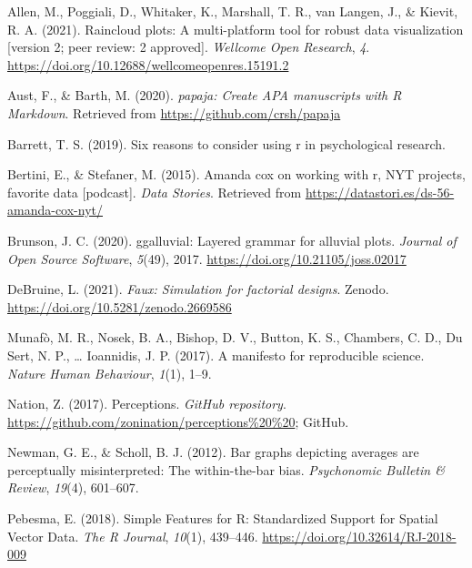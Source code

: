 \documentclass[
  english,
  doc,floatsintext]{apa6}
\newlength{\cslhangindent}
\newenvironment{CSLReferences}[2] %
 {%
  \setlength{\parindent}{0pt}
  \ifodd #1 \everypar{\setlength{\hangindent}{\cslhangindent}}\ignorespaces\fi
  \ifnum #2 > 0
  \setlength{\parskip}{#2\baselineskip}
  \fi
 }%
 {}
\begin{document}
\hypertarget{refs}{}
\begin{CSLReferences}{1}{0}
\leavevmode{}%
Allen, M., Poggiali, D., Whitaker, K., Marshall, T. R., van Langen, J., \& Kievit, R. A. (2021). Raincloud plots: A multi-platform tool for robust data visualization {[}version 2; peer review: 2 approved{]}. \emph{Wellcome Open Research}, \emph{4}. \url{https://doi.org/10.12688/wellcomeopenres.15191.2}

\leavevmode{}%
Aust, F., \& Barth, M. (2020). \emph{{papaja}: {Create} {APA} manuscripts with {R Markdown}}. Retrieved from \url{https://github.com/crsh/papaja}

\leavevmode{}%
Barrett, T. S. (2019). Six reasons to consider using r in psychological research.

\leavevmode{}%
Bertini, E., \& Stefaner, M. (2015). Amanda cox on working with r, NYT projects, favorite data {[}podcast{]}. \emph{Data Stories}. Retrieved from \url{https://datastori.es/ds-56-amanda-cox-nyt/}

\leavevmode{}%
Brunson, J. C. (2020). {ggalluvial}: Layered grammar for alluvial plots. \emph{Journal of Open Source Software}, \emph{5}(49), 2017. \url{https://doi.org/10.21105/joss.02017}

\leavevmode{}%
DeBruine, L. (2021). \emph{Faux: Simulation for factorial designs}. Zenodo. \url{https://doi.org/10.5281/zenodo.2669586}

\leavevmode{}%
Munafò, M. R., Nosek, B. A., Bishop, D. V., Button, K. S., Chambers, C. D., Du Sert, N. P., \ldots{} Ioannidis, J. P. (2017). A manifesto for reproducible science. \emph{Nature Human Behaviour}, \emph{1}(1), 1--9.

\leavevmode{}%
Nation, Z. (2017). Perceptions. \emph{GitHub repository}. \url{https://github.com/zonination/perceptions\%20\%20}; GitHub.

\leavevmode{}%
Newman, G. E., \& Scholl, B. J. (2012). Bar graphs depicting averages are perceptually misinterpreted: The within-the-bar bias. \emph{Psychonomic Bulletin \& Review}, \emph{19}(4), 601--607.

\leavevmode{}%
Pebesma, E. (2018). {Simple Features for R: Standardized Support for Spatial Vector Data}. \emph{{The R Journal}}, \emph{10}(1), 439--446. \url{https://doi.org/10.32614/RJ-2018-009}


\end{CSLReferences}
\end{document}
